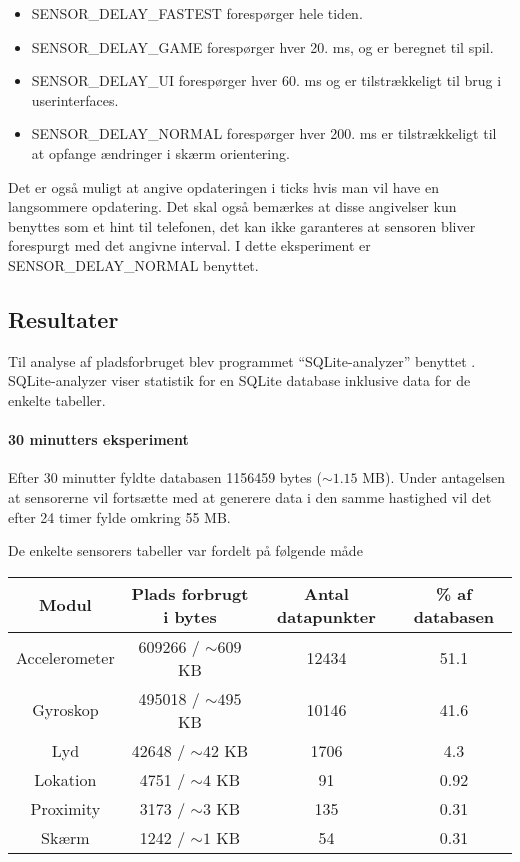 \begin{itemize}
	\item SENSOR\_DELAY\_FASTEST forespørger hele tiden.
	\item SENSOR\_DELAY\_GAME forespørger hver 20. ms, og er beregnet til spil.
	\item SENSOR\_DELAY\_UI forespørger hver 60. ms og er tilstrækkeligt til brug i userinterfaces.
	\item SENSOR\_DELAY\_NORMAL forespørger hver 200. ms er tilstrækkeligt til at opfange ændringer i skærm orientering.
\end{itemize}
Det er også muligt at angive opdateringen i ticks hvis man vil have en langsommere opdatering.
Det skal også bemærkes at disse angivelser kun benyttes som et hint til telefonen, det kan ikke garanteres at sensoren bliver forespurgt med det angivne interval.
I dette eksperiment er SENSOR\_DELAY\_NORMAL benyttet.


\subsection{Resultater}
Til analyse af pladsforbruget blev programmet ``SQLite-analyzer'' benyttet \cite{sqliteanalyzer}.
SQLite-analyzer viser statistik for en SQLite database inklusive data for de enkelte tabeller.

\paragraph{30 minutters eksperiment}
Efter 30 minutter fyldte databasen 1156459 bytes ($\sim 1.15$ MB).
Under antagelsen at sensorerne vil fortsætte med at generere data i den samme hastighed vil det efter 24 timer fylde omkring 55 MB. 

De enkelte sensorers tabeller var fordelt på følgende måde

\begin{tabular}{|c|c|c|c|}
	\hline Modul 			& Plads forbrugt i bytes	& Antal datapunkter  & \% af databasen \\
	\hline Accelerometer 	& 609266 / $\sim 609$ KB	& 12434 			 & 51.1 \\ 
	\hline Gyroskop 		& 495018 / $\sim 495$ KB	& 10146 			 & 41.6\\ 
	\hline Lyd 				& 42648  / $\sim 42$ KB		& 1706 			 	 & 4.3 \\ 
	\hline Lokation 		& 4751 	 / $\sim 4$ KB		& 91 				 & 0.92 \\ 
	\hline Proximity 		& 3173 	 / $\sim 3$ KB		& 135 				 & 0.31 \\ 
	\hline Skærm 			& 1242 	 / $\sim 1$	KB		& 54				 & 0.31 \\ 
	\hline 
\end{tabular} 


